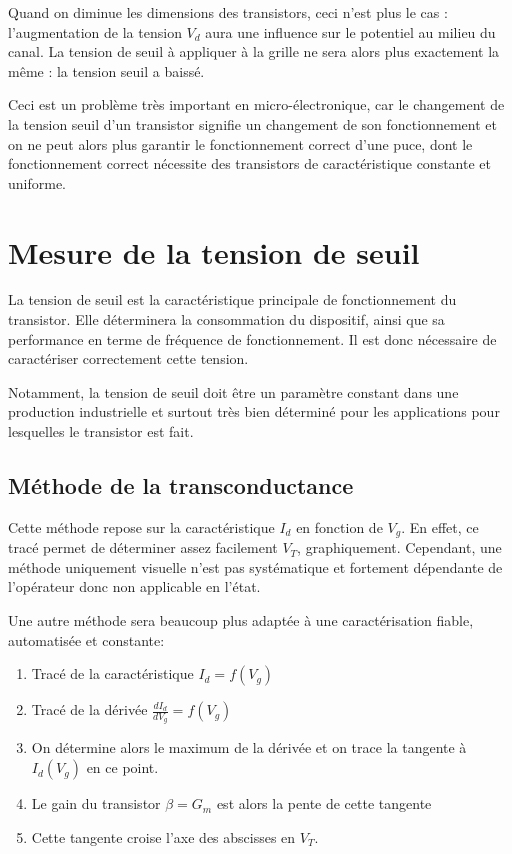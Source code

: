 \documentclass[a4paper,11pt]{report}
\begin{document}
Quand on diminue les dimensions des transistors, ceci n'est plus le cas : l'augmentation de la tension $V_d$ aura une influence sur le potentiel au milieu du canal. La tension de seuil à appliquer à la grille ne sera alors plus exactement la même : la tension seuil a baissé.

Ceci est un problème très important en micro-électronique, car le changement de la tension seuil d'un transistor signifie un changement de son fonctionnement et on ne peut alors plus garantir le fonctionnement correct d'une puce, dont le fonctionnement correct nécessite des transistors de caractéristique constante et uniforme.

\chapter{Mesure de la tension de seuil}
La tension de seuil est la caractéristique principale de fonctionnement du transistor. Elle déterminera la consommation du dispositif, ainsi que sa performance en terme de fréquence de fonctionnement. Il est donc nécessaire de caractériser correctement cette tension.

Notamment, la tension de seuil doit être un paramètre constant dans une production industrielle et surtout très bien déterminé pour les applications pour lesquelles le transistor est fait.

\section{Méthode de la transconductance}
Cette méthode repose sur la caractéristique $I_d$ en fonction de $V_g$. En effet, ce tracé permet de déterminer assez facilement $V_T$, graphiquement. Cependant, une méthode uniquement visuelle n'est pas systématique et fortement dépendante de l'opérateur donc non applicable en l'état.

Une autre méthode sera beaucoup plus adaptée à une caractérisation fiable, automatisée et constante:
\begin{enumerate}
    \item Tracé de la caractéristique $I_d = f(V_g)$
    \item Tracé de la dérivée $\frac{d I_d}{d V_g} = f(V_g)$
    \item On détermine alors le maximum de la dérivée et on trace la tangente à $I_d(V_g)$ en ce point.
    \item Le gain du transistor $\beta = G_m$ est alors la pente de cette tangente
    \item Cette tangente croise l'axe des abscisses en $V_T$.
\end{enumerate}
\end{document}
